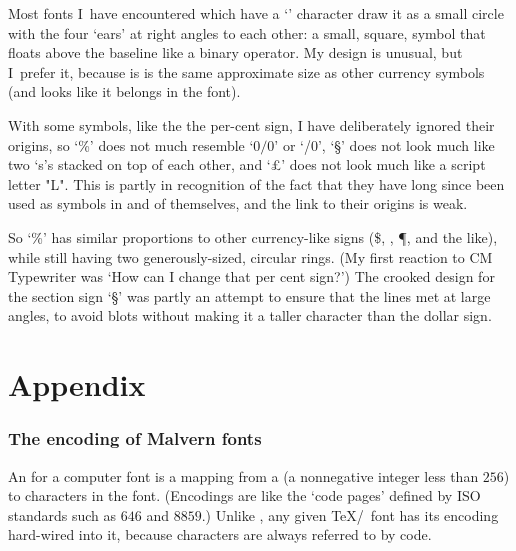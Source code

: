 	Most fonts I~have encountered which have a `\currency'
	character\marginchar{\currency} draw it as a small circle with
	the four `ears' at right angles to each other: a small, square,
	symbol that floats above the baseline like a binary operator.
	My design is unusual, but I~prefer it, because is is the same
	approximate size as other currency symbols (and looks like it
	belongs in the font).




	With some symbols, like the the per-cent sign, I have
	deliberately ignored their origins, so `\%' does not much
	resemble `$0/0$' or `/0', `\S' does not look much like two
	`s's stacked on top of each other, and `\pounds' does not look
	much like a script letter "L".  This is partly in recognition of
	the fact that they have long since been used as symbols in and
	of themselves, and the link to their origins is weak.

	So `\%' has similar proportions to other currency-like
	signs\marginchar{\%\S{}} (\${}, \yen, \P, and the like), while
	still having two generously-sized, circular rings.  (My first
	reaction to CM Typewriter was `How can I change that per cent
	sign?')  The crooked design for the section sign `\S{}' was
	partly an attempt to ensure that the lines met at large angles,
	to avoid blots without making it a taller character than the
	dollar sign.

\fi
\part{Appendix}


\section{The encoding of Malvern fonts}


	An  for a computer font is a mapping from a
	 (a nonnegative integer less than
	$256$) to characters in the font.  (Encodings are like the `code
	pages' defined by ISO standards such as $646$ and $8859$.)
	Unlike \PS, any given \TeX/\MF\ font has its encoding hard-wired
	into it, because characters are always referred to by code.

